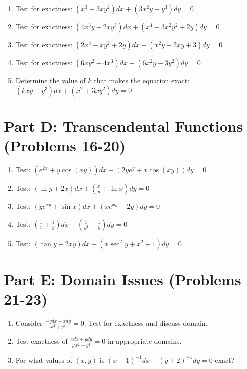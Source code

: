 \documentclass[12pt]{article}
\begin{document}
\begin{enumerate}[start=11]
\item Test for exactness: $(x^3 + 3xy^2)dx + (3x^2y + y^3)dy = 0$

\item Test for exactness: $(4x^3y - 2xy^3)dx + (x^4 - 3x^2y^2 + 2y)dy = 0$

\item Test for exactness: $(2x^3 - xy^2 + 2y)dx + (x^2y - 2xy + 3)dy = 0$

\item Test for exactness: $(6xy^2 + 4x^3)dx + (6x^2y - 3y^2)dy = 0$

\item Determine the value of $k$ that makes the equation exact:
$(kxy + y^3)dx + (x^2 + 3xy^2)dy = 0$
\end{enumerate}

\section*{Part D: Transcendental Functions (Problems 16-20)}

\begin{enumerate}[start=16]
\item Test: $(e^{2x} + y\cos(xy))dx + (2ye^y + x\cos(xy))dy = 0$

\item Test: $(\ln y + 2x)dx + \left(\frac{x}{y} + \ln x\right)dy = 0$

\item Test: $(ye^{xy} + \sin x)dx + (xe^{xy} + 2y)dy = 0$

\item Test: $\left(\frac{1}{x} + \frac{1}{y}\right)dx + \left(\frac{x}{y^2} - \frac{1}{y}\right)dy = 0$

\item Test: $(\tan y + 2xy)dx + (x\sec^2 y + x^2 + 1)dy = 0$
\end{enumerate}

\section*{Part E: Domain Issues (Problems 21-23)}

\begin{enumerate}[start=21]
\item Consider $\frac{-y dx + x dy}{x^2 + y^2} = 0$. Test for exactness and discuss domain.

\item Test exactness of $\frac{x dx + y dy}{\sqrt{x^2 + y^2}} = 0$ in appropriate domains.

\item For what values of $(x,y)$ is $(x-1)^{-1}dx + (y+2)^{-1}dy = 0$ exact?
\end{enumerate}
\end{document}
